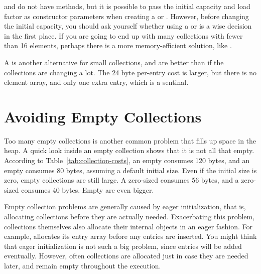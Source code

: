  and  do not have  methods,
but it is possible to pass the initial capacity and load factor as constructor
parameters when creating a  or . 
However, before changing the initial capacity, you should
ask yourself whether using a  or  is a
wise decision in the first place. If you are going to end up with many
collections with fewer than 16 elements, perhaps there is a more memory-efficient solution, like
.
  
A  is another alternative for small collections, and are
better than  if the collections are changing a lot. The
24 byte per-entry cost is larger, but there is no element array, and only one
extra entry, which is a sentinal.

\section{Avoiding Empty Collections}

Too many empty collections is another common problem that fills up space in the
heap. A quick look inside an empty collection shows that it is not all that
empty. According to Table~\ref{tab:collection-costs}, an empty  consumes
120 bytes, and an empty  consumes 80
bytes, assuming a default initial size. 
Even if the initial size is zero, empty collections are still
large. A zero-sized  consumes 56 bytes, and a zero-sized
 consumes 40 bytes. Empty  are even bigger.

Empty collection problems are generally caused by eager initialization, that is,
allocating collections before they are actually needed. Exacerbating this
problem, collections themselves also allocate their internal objects in an eager
fashion. For example,  allocates its entry array before any entries are inserted.
You might think that eager initialization is not such a big problem, since
entries will be added eventually. However, often collections are allocated
just in case they are needed later, and remain empty throughout the execution.

